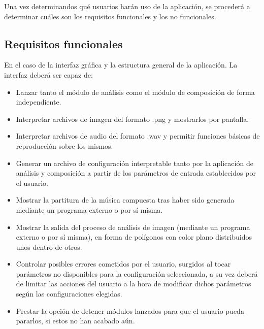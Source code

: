 	Una vez determinandos qué usuarios harán uso de la aplicación, se procederá a determinar cuáles son los requisitos funcionales y los no funcionales.
	
	\subsection{Requisitos funcionales}
	
	En el caso de la interfaz gráfica y la estructura general de la aplicación. La interfaz deberá ser capaz de:
	
	 \begin{itemize}
		 \item Lanzar tanto el módulo de análisis como el módulo de composición de forma independiente.
		 \item Interpretar archivos de imagen del formato .png y mostrarlos por pantalla.
		 \item Interpretar archivos de audio del formato .wav y permitir funciones básicas de reproducción sobre los mismos.
		 \item Generar un archivo de configuración interpretable tanto por la aplicación de análisis y composición a partir de los parámetros de entrada establecidos por el usuario.
		 \item Mostrar la partitura de la música compuesta tras haber sido generada mediante un programa externo o por sí misma.
		 \item Mostrar la salida del proceso de análisis de imagen (mediante un programa externo o por sí misma), en forma de polígonos con color plano distribuidos unos dentro de otros.
		 \item Controlar posibles errores cometidos por el usuario, surgidos al tocar parámetros no disponibles para la configuración seleccionada, a su vez deberá de limitar las acciones del usuario a la hora de modificar dichos parámetros según las configuraciones elegidas.
		 \item Prestar la opción de detener módulos lanzados para que el usuario pueda pararlos, si estos no han acabado aún.
	 \end{itemize}
	 
